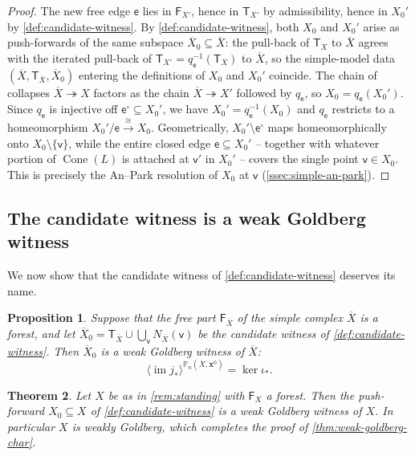 \documentclass[reqno]{amsart}
\newtheorem{theorem}{Theorem}[section]
\newtheorem{proposition}[theorem]{Proposition}
\theoremstyle{definition}
\newcommand\bfx{\mathbf{x}}
\newcommand\sfT{\mathsf{T}}
\newcommand\sfe{\mathsf{e}}
\newcommand\sfv{\mathsf{v}}
\newcommand{\PB}{\mathbb{P}}
\newcommand{\im}{\operatorname{im}}
\newcommand{\co}[1]{\mathopen{\langle}#1\mathclose{\rangle}} %
\newcommand{\base}{\bfx^0}
\renewcommand{\bar}{\overline}
\numberwithin{equation}{section}
\begin{document}
\begin{proof}
The new free edge \(\sfe\) lies in \(\mathsf{F}_{X'}\), hence in
\(\sfT_{X'}\) by admissibility, hence in \(X_0'\) by
\cref{def:candidate-witness}. By
\cref{def:candidate-witness}, both \(X_0\) and \(X_0'\)
arise as push-forwards of the same subspace
\(\bar X_0\subseteq\bar X\): the pull-back of \(\sfT_X\) to \(\bar X\)
agrees with the iterated pull-back of \(\sfT_{X'}=q_\sfe^{-1}(\sfT_X)\) to
\(\bar X\), so the simple-model data
\((\bar X,\sfT_{\bar X},\bar X_0)\) entering the definitions of
\(X_0\) and \(X_0'\) coincide. The chain of collapses
\(\bar X\twoheadrightarrow X\) factors as the chain
\(\bar X\twoheadrightarrow X'\) followed by \(q_\sfe\), so
\(X_0=q_\sfe(X_0')\). Since \(q_\sfe\) is injective off
\(\sfe^\circ\subseteq X_0'\), we have \(X_0'=q_\sfe^{-1}(X_0)\) and \(q_\sfe\)
restricts to a homeomorphism
\(X_0'/\sfe\xrightarrow{\cong}X_0\). Geometrically,
\(X_0'\setminus \sfe^\circ\) maps homeomorphically onto
\(X_0\setminus\{\sfv\}\), while the entire closed edge \(\sfe\subseteq X_0'\) -- together with whatever portion of
\(\operatorname{Cone}(L)\) is attached at \(\sfv'\) in \(X_0'\) -- covers
the single point \(\sfv\in X_0\). This is precisely the An--Park
resolution of \(X_0\) at \(\sfv\) (\cref{ssec:simple-an-park}).
\end{proof}

\subsection{The candidate witness is a weak Goldberg witness}
\label{ssec:candidate-is-witness}

We now show that the candidate witness of
\cref{def:candidate-witness} deserves its name.

\begin{proposition}\label{thm:candidate-witness-weak}
Suppose that the free part \(\mathsf{F}_{\bar X}\) of the simple
complex \(\bar X\) is a forest, and let
\(\bar X_0=\sfT_{\bar X}\cup\bigcup_{\sfv} N_{\bar X}(\sfv)\) be the
candidate witness of \cref{def:candidate-witness}. Then
\(\bar X_0\) is a weak Goldberg witness of \(\bar X\):
\[
\co{\im j_\ast}^{\PB_n(\bar X,\base)}=\ker\iota_\ast .
\]
\end{proposition}

\begin{theorem}\label{cor:candidate-witness-descends}
Let \(X\) be as in \cref{rem:standing} with \(\mathsf{F}_X\) a
forest. Then the push-forward \(X_0\subseteq X\) of
\cref{def:candidate-witness} is a weak Goldberg witness of
\(X\). In particular \(X\) is weakly Goldberg, which completes
the proof of \cref{thm:weak-goldberg-char}.
\end{theorem}
\end{document}
